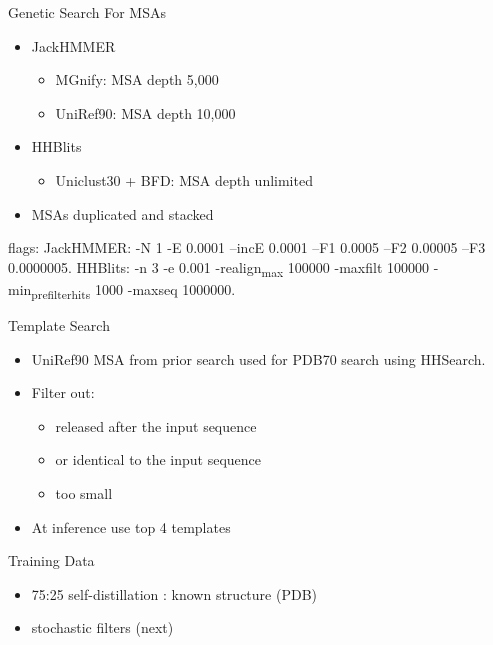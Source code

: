 \documentclass[presentation, smaller]{beamer}
\begin{document}
\begin{frame}[label={sec:org11f2f94}]{Genetic Search \cite{jumperHighlyAccurateProtein2021}}
For MSAs
\begin{itemize}
\item JackHMMER
\begin{itemize}
\item MGnify: MSA depth 5,000
\item UniRef90: MSA depth 10,000
\end{itemize}
\item HHBlits
\begin{itemize}
\item Uniclust30 + BFD: MSA depth unlimited
\end{itemize}
\item MSAs duplicated and stacked
\end{itemize}

flags:
  JackHMMER: -N 1 -E 0.0001 --incE 0.0001 --F1 0.0005 --F2 0.00005 --F3 0.0000005.
  HHBlits: -n 3 -e 0.001 -realign\textsubscript{max} 100000 -maxfilt 100000 -min\textsubscript{prefilter}\textsubscript{hits} 1000 -maxseq 1000000.
\end{frame}

\begin{frame}[label={sec:org44170df}]{Template Search \cite{jumperHighlyAccurateProtein2021}}
\begin{itemize}
\item UniRef90 MSA from prior search used for PDB70 search using HHSearch.
\item Filter out:
\begin{itemize}
\item released after the input sequence
\item or identical to the input sequence
\item too small
\end{itemize}
\item At inference use top 4 templates
\end{itemize}
\end{frame}

\begin{frame}[label={sec:orgcead5cb}]{Training Data \cite{jumperHighlyAccurateProtein2021}}
\begin{itemize}
\item 75:25 self-distillation : known structure (PDB)
\item stochastic filters (next)
\end{itemize}
\end{frame}
\end{document}

